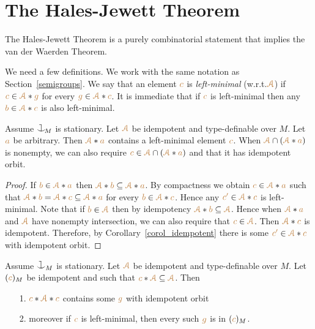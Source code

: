 \section{The Hales-Jewett Theorem}
\label{HJ}

The Hales-Jewett Theorem is a purely combinatorial statement 
that implies the van der Waerden Theorem.

We need a few definitions.
We work with the same notation as Section~\ref{semigroups}.
We say that an element ${\mr c}$ is \emph{left-minimal\/} (w.r.t.\@ $\mrA$) if 
${\mr c}\in\mrA*{\mr g}$ for every ${\mr g}\in\mrA*{\mr c}$.
It is immediate that if ${\mr c}$ is left-minimal then any ${\mr b}\in\mrA*{\mr c}$ is also left-minimal.%

\begin{proposition}\label{prop_minimal_existence1}
Assume $\cnonfork_{\!M}$ is stationary.
Let $\mrA$ be idempotent and type-definable over $M$.
Let ${\mr a}$ be arbitrary.
Then $\mrA*{\mr a}$ contains a left-minimal element ${\mr c}$.
When $\mrA\cap(\mrA*{\mr a})$ is nonempty, we can also require ${\mr c}\in\mrA\cap(\mrA*{\mr a})$ and that it has idempotent orbit.
\end{proposition}
\begin{proof}
If ${\mr b}\in\mrA*{\mr a}$ then $\mrA*{\mr b}\subseteq\mrA*{\mr a}$.
By compactness we obtain ${\mr c}\in\mrA*{\mr a}$ such that $\mrA*{\mr b}=\mrA*{\mr c}\subseteq\mrA*{\mr a}$ for every ${\mr b}\in\mrA*{\mr c}$.
Hence any ${\mr c'}\in\mrA*{\mr c}$ is left-minimal.
Note that if ${\mr b}\in\mrA$ then by idempotency  $\mrA*{\mr b}\subseteq\mrA$. Hence when $\mrA*{\mr a}$ and $\mrA$ have nonempty intersection, we can also require that ${\mr c}\in\mrA$. 
Then $\mrA*{\mr c}$ is idempotent. 
Therefore, by Corollary~\ref{corol_idempotent} there is some ${\mr c'}\in\mrA*{\mr c}$ with idempotent orbit.
\end{proof}

\begin{proposition}\label{prop_minimal_existence2}
  Assume $\cnonfork_M$ is stationary.
  Let $\mrA$ be idempotent and type-definable over $M$.
  Let $({\mr c})_M$ be idempotent and such that ${\mr c}*\mrA\subseteq\mrA$.
  Then
  \begin{itemize}
  \item[1.]  ${\mr c}*\mrA*{\mr c}$ contains some ${\mr g}$ with idempotent orbit
  \item[2.] moreover if ${\mr c}$ is left-minimal, then every such ${\mr g}$ is in $({\mr c})_M$.
  \end{itemize} 
\end{proposition}

